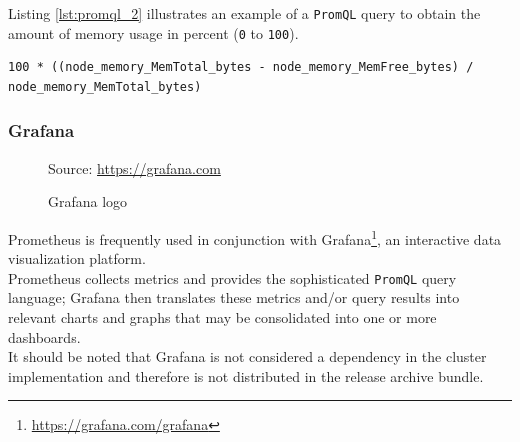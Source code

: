 Listing \ref{lst:promql_2} illustrates an example of a \texttt{PromQL} query to obtain
the amount of memory usage in percent (\texttt{0} to \texttt{100}).

\begin{lstlisting}[language=promql, numbers=none, alsoletter={_, 0, 1}, morekeywords={[2]{node_memory_MemTotal_bytes, node_memory_MemFree_bytes}}, morekeywords={[4]{100}}, xleftmargin=\parindent, label={lst:promql_2}, caption=\texttt{PromQL} query to obtain the amount of memory usage in percent]
  100 * ((node_memory_MemTotal_bytes - node_memory_MemFree_bytes) / node_memory_MemTotal_bytes)
\end{lstlisting}

\subsubsection{Grafana}
\label{subsubsec:implementation_dependencies_prometheus_grafana}

\begin{figure} %
  \centering
  \def\stackalignment{l} %
  {\scriptsize \parbox[t]{\linewidth}{ Source: \url{https://grafana.com}} }
  \caption{Grafana logo}
\end{figure}

Prometheus is frequently used in conjunction with Grafana\footnote{\url{https://grafana.com/grafana}},
an interactive data visualization platform. \\ %
Prometheus collects metrics and provides the sophisticated \texttt{PromQL} query
language; Grafana then translates these metrics and/or query results into relevant
charts and graphs that may be consolidated into one or more dashboards. \\ %
It should be noted that Grafana is not considered a dependency in the cluster implementation
and therefore is not distributed in the release archive bundle.

